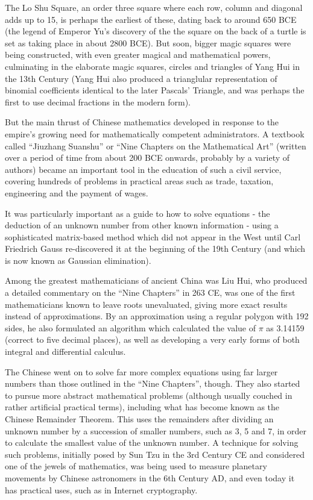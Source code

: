 The Lo Shu Square, an order three square where each row, column and diagonal adds up to 15, is perhaps the earliest of these, dating back to around 650 BCE (the legend of Emperor Yu’s discovery of the the square on the back of a turtle is set as taking place in about 2800 BCE). But soon, bigger magic squares were being constructed, with even greater magical and mathematical powers, culminating in the elaborate magic squares, circles and triangles of Yang Hui in the 13th Century (Yang Hui also produced a trianglular representation of binomial coefficients identical to the later Pascals’ Triangle, and was perhaps the first to use decimal fractions in the modern form).

But the main thrust of Chinese mathematics developed in response to the empire’s growing need for mathematically competent administrators. A textbook called “Jiuzhang Suanshu” or “Nine Chapters on the Mathematical Art” (written over a period of time from about 200 BCE onwards, probably by a variety of authors) became an important tool in the education of such a civil service, covering hundreds of problems in practical areas such as trade, taxation, engineering and the payment of wages.

It was particularly important as a guide to how to solve equations - the deduction of an unknown number from other known information - using a sophisticated matrix-based method which did not appear in the West until Carl Friedrich Gauss re-discovered it at the beginning of the 19th Century (and which is now known as Gaussian elimination).

Among the greatest mathematicians of ancient China was Liu Hui, who produced a detailed commentary on the “Nine Chapters” in 263 CE, was one of the first mathematicians known to leave roots unevaluated, giving more exact results instead of approximations. By an approximation using a regular polygon with 192 sides, he also formulated an algorithm which calculated the value of $ \pi $ as 3.14159 (correct to five decimal places), as well as developing a very early forms of both integral and differential calculus.

The Chinese went on to solve far more complex equations using far larger numbers than those outlined in the “Nine Chapters”, though. They also started to pursue more abstract mathematical problems (although usually couched in rather artificial practical terms), including what has become known as the Chinese Remainder Theorem. This uses the remainders after dividing an unknown number by a succession of smaller numbers, such as 3, 5 and 7, in order to calculate the smallest value of the unknown number. A technique for solving such problems, initially posed by Sun Tzu in the 3rd Century CE and considered one of the jewels of mathematics, was being used to measure planetary movements by Chinese astronomers in the 6th Century AD, and even today it has practical uses, such as in Internet cryptography.

